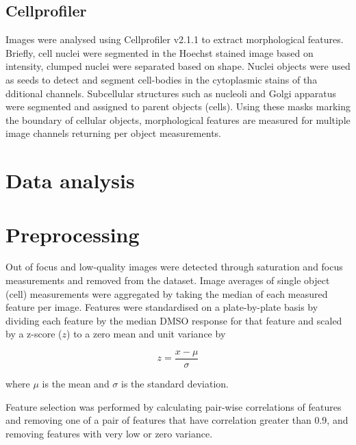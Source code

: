 \documentclass[a4paper,11pt,twoside,openright]{scrbook}
\begin{document}
\subsection{Cellprofiler}
Images were analysed using Cellprofiler v2.1.1 to extract morphological features.
Briefly, cell nuclei were segmented in the Hoechst stained image based on intensity, clumped nuclei were separated based on shape.
Nuclei objects were used as seeds to detect and segment cell-bodies in the cytoplasmic stains of tha dditional channels.
Subcellular structures such as nucleoli and Golgi apparatus were segmented and assigned to parent objects (cells).
Using these masks marking the boundary of cellular objects, morphological features are measured for multiple image channels returning per object measurements.

\section{Data analysis}

\section{Preprocessing}
Out of focus and low-quality images were detected through saturation and focus measurements and removed from the dataset.
Image averages of single object (cell) measurements were aggregated by taking the median of each measured feature per image.
Features were standardised on a plate-by-plate basis by dividing each feature by the median DMSO response for that feature and scaled by a z-score ($z$) to a zero mean and unit variance by

\begin{equation} \label{eq:zscore}
    z = \frac{x - \mu}{\sigma}
\end{equation}

where $\mu$ is the mean and $\sigma$ is the standard deviation.

Feature selection was performed by calculating pair-wise correlations of features and removing one of a pair of features that have correlation greater than 0.9, and removing features with very low or zero variance.




\end{document}
